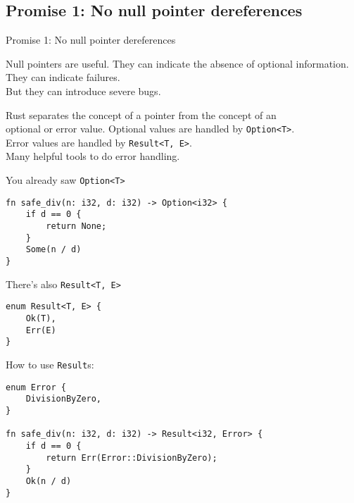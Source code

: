 \subsection{Promise 1: No null pointer dereferences}


\begin{frame}{Promise 1: No null pointer dereferences}

\begin{block}{Null pointers are useful.}
They can indicate the absence of optional information.\\
They can indicate failures.\\
\pause
But they can introduce severe bugs.
\end{block}
\vspace{1em}
\pause
\begin{block}{Rust separates the concept of a pointer from the concept of an\\
		optional or error value.}
	Optional values are handled by \texttt{Option<T>}.\\
  Error values are handled by \texttt{Result<T, E>}.\\
	Many helpful tools to do error handling.
\end{block}

\end{frame}


\begin{frame}[fragile]{You already saw \texttt{Option<T>}}
\begin{verbatim}
fn safe_div(n: i32, d: i32) -> Option<i32> {
    if d == 0 {
        return None;
    }
    Some(n / d)
}
\end{verbatim}
\end{frame}


\begin{frame}[fragile]{There's also \texttt{Result<T, E>}}
\begin{verbatim}
enum Result<T, E> {
    Ok(T),
    Err(E)
}
\end{verbatim}
\end{frame}


\begin{frame}[fragile]{How to use \texttt{Result}s:}
\begin{verbatim}
enum Error {
    DivisionByZero,
}

fn safe_div(n: i32, d: i32) -> Result<i32, Error> {
    if d == 0 {
        return Err(Error::DivisionByZero);
    }
    Ok(n / d)
}
\end{verbatim}
\end{frame}

